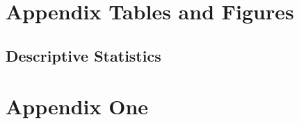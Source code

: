 \documentclass[12pt]{article}
\begin{document}
\newpage
\appendix
\setcounter{table}{0}
\renewcommand{\tablename}{Appendix Table}
\renewcommand{\figurename}{Appendix Figure}
\renewcommand{\thetable}{A\arabic{table}}
\setcounter{figure}{0}
\renewcommand{\thefigure}{A\arabic{figure}}

\section{Appendix Tables and Figures}
\subsection{Descriptive Statistics}



\newpage


\newpage 
\section{Appendix One \label{sec:appendix:first}}
\renewcommand{\thetable}{B\arabic{table}}
\setcounter{table}{0}
\renewcommand{\thefigure}{B\arabic{figure}}
\setcounter{figure}{0}
\end{document}
